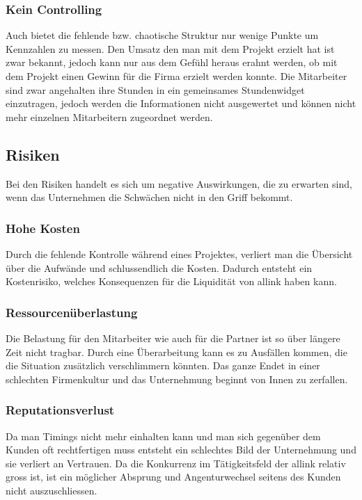 \subsubsection{Kein Controlling}
Auch bietet die fehlende bzw. chaotische Struktur nur wenige Punkte um Kennzahlen
zu messen. Den Umsatz den man mit dem Projekt erzielt hat ist zwar bekannt,
jedoch kann nur aus dem Gefühl heraus erahnt werden, ob mit dem Projekt einen
Gewinn für die Firma erzielt werden konnte. Die Mitarbeiter sind zwar angehalten
ihre Stunden in ein gemeinsames Stundenwidget einzutragen, jedoch werden
die Informationen nicht ausgewertet und können nicht mehr einzelnen Mitarbeitern
zugeordnet werden.

\subsection{Risiken}
Bei den Risiken handelt es sich um negative Auswirkungen, die zu erwarten sind,
wenn das Unternehmen die Schwächen nicht in den Griff bekommt.

\subsubsection{Hohe Kosten}
Durch die fehlende Kontrolle während eines Projektes, verliert man die
Übersicht über die Aufwände und schlussendlich die Kosten. Dadurch entsteht
ein Kostenrisiko, welches Konsequenzen für die Liquidität von allink haben kann.

\subsubsection{Ressourcenüberlastung}
Die Belastung für den Mitarbeiter wie auch für die Partner ist so über
längere Zeit nicht tragbar. Durch eine Überarbeitung kann es zu Ausfällen kommen, die
die Situation zusätzlich verschlimmern könnten. Das ganze Endet in einer 
schlechten Firmenkultur und das Unternehmung beginnt von Innen zu zerfallen.

\subsubsection{Reputationsverlust}
Da man Timings nicht mehr einhalten kann und man sich gegenüber dem Kunden
oft rechtfertigen muss entsteht ein schlechtes Bild der Unternehmung und sie
verliert an Vertrauen. Da die Konkurrenz im Tätigkeitsfeld der allink relativ
gross ist, ist ein möglicher Absprung und Angenturwechsel seitens des Kunden nicht 
auszuschliessen.
